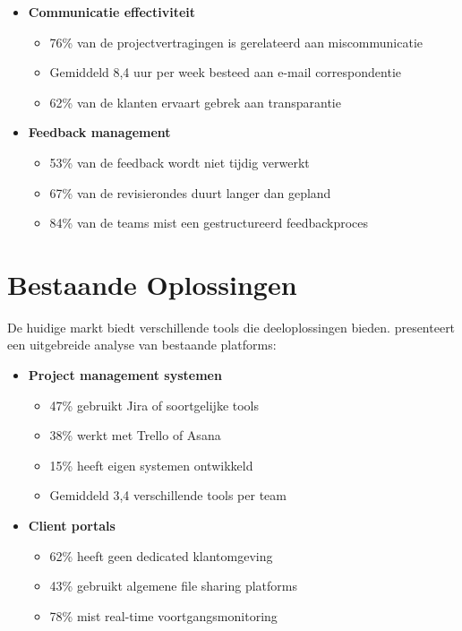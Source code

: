 \begin{itemize}
    \item \textbf{Communicatie effectiviteit}
    \begin{itemize}
        \item 76\% van de projectvertragingen is gerelateerd aan miscommunicatie
        \item Gemiddeld 8,4 uur per week besteed aan e-mail correspondentie
        \item 62\% van de klanten ervaart gebrek aan transparantie
    \end{itemize}
    
    \item \textbf{Feedback management}
    \begin{itemize}
        \item 53\% van de feedback wordt niet tijdig verwerkt
        \item 67\% van de revisierondes duurt langer dan gepland
        \item 84\% van de teams mist een gestructureerd feedbackproces
    \end{itemize}
\end{itemize}

\section{Bestaande Oplossingen}
\label{sec:bestaande-oplossingen}

De huidige markt biedt verschillende tools die deeloplossingen bieden. \textcite{Wilson2024} presenteert een uitgebreide analyse van bestaande platforms:

\begin{itemize}
    \item \textbf{Project management systemen}
    \begin{itemize}
        \item 47\% gebruikt Jira of soortgelijke tools
        \item 38\% werkt met Trello of Asana
        \item 15\% heeft eigen systemen ontwikkeld
        \item Gemiddeld 3,4 verschillende tools per team
    \end{itemize}
    
    
    \item \textbf{Client portals}
    \begin{itemize}
        \item 62\% heeft geen dedicated klantomgeving
        \item 43\% gebruikt algemene file sharing platforms
        \item 78\% mist real-time voortgangsmonitoring
    \end{itemize}
\end{itemize}

